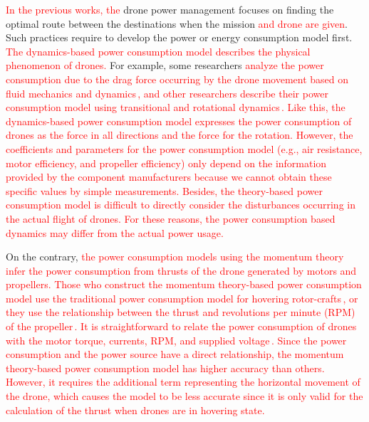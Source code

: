 \documentclass[journal]{./template/IEEEtran}
\begin{document}
\textcolor{red}{In the previous works, the} drone power management focuses on finding the optimal route between the destinations when the mission \textcolor{red}{and drone are given}. 
Such practices require to develop the power or energy consumption model first. 
\textcolor{red}{The dynamics-based power consumption model describes the physical phenomenon of drones.} 
For example, some researchers \textcolor{red}{analyze the power consumption due to the drag force occurring by the drone movement based on fluid mechanics and dynamics\,\cite{ref_3}, and other researchers describe their power consumption model using transitional and rotational dynamics\,\cite{ref_23}. 
Like this, the dynamics-based power consumption model expresses the power consumption of drones as the force in all directions and the force for the rotation.
However, the coefficients and parameters for the power consumption model (e.g., air resistance, motor efficiency, and propeller efficiency) only depend on the information provided by the component manufacturers because we cannot obtain these specific values by simple measurements.
Besides, the theory-based power consumption model is difficult to directly consider the disturbances occurring in the actual flight of drones. For these reasons, the power consumption based dynamics may differ from the actual power usage.
}

On the contrary, \textcolor{red}{the power consumption models using the momentum theory infer the power consumption from thrusts of the drone generated by motors and propellers.
Those who construct the momentum theory-based power consumption model use the traditional power consumption model for hovering rotor-crafts\,\cite{ref_4}, or they use the relationship between the thrust and revolutions per minute (RPM) of the propeller\,\cite{ref_5, ref_24}. 
It is straightforward to relate the power consumption of drones with the motor torque, currents, RPM, and supplied voltage\,\cite{ref_6,ref_7}.
Since the power consumption and the power source have a direct relationship, the momentum theory-based power consumption model has higher accuracy than others. However, it requires the additional term representing the horizontal movement of the drone, which causes the model to be less accurate since it is only valid for the calculation of the thrust when drones are in hovering state.
}
\end{document}

